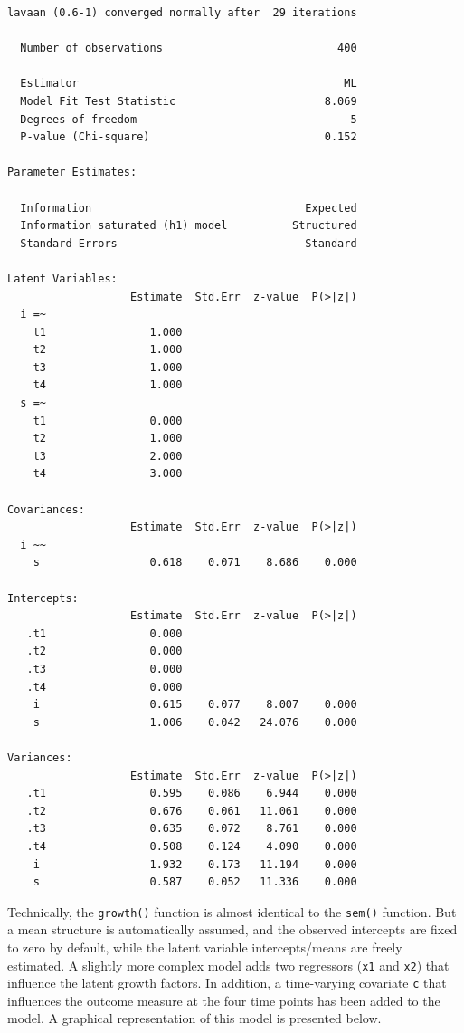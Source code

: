\begin{verbatim}
lavaan (0.6-1) converged normally after  29 iterations

  Number of observations                           400

  Estimator                                         ML
  Model Fit Test Statistic                       8.069
  Degrees of freedom                                 5
  P-value (Chi-square)                           0.152

Parameter Estimates:

  Information                                 Expected
  Information saturated (h1) model          Structured
  Standard Errors                             Standard

Latent Variables:
                   Estimate  Std.Err  z-value  P(>|z|)
  i =~                                                
    t1                1.000                           
    t2                1.000                           
    t3                1.000                           
    t4                1.000                           
  s =~                                                
    t1                0.000                           
    t2                1.000                           
    t3                2.000                           
    t4                3.000                           

Covariances:
                   Estimate  Std.Err  z-value  P(>|z|)
  i ~~                                                
    s                 0.618    0.071    8.686    0.000

Intercepts:
                   Estimate  Std.Err  z-value  P(>|z|)
   .t1                0.000                           
   .t2                0.000                           
   .t3                0.000                           
   .t4                0.000                           
    i                 0.615    0.077    8.007    0.000
    s                 1.006    0.042   24.076    0.000

Variances:
                   Estimate  Std.Err  z-value  P(>|z|)
   .t1                0.595    0.086    6.944    0.000
   .t2                0.676    0.061   11.061    0.000
   .t3                0.635    0.072    8.761    0.000
   .t4                0.508    0.124    4.090    0.000
    i                 1.932    0.173   11.194    0.000
    s                 0.587    0.052   11.336    0.000
\end{verbatim}

Technically, the \texttt{growth()} function is almost identical to the
\texttt{sem()} function. But a mean structure is automatically assumed,
and the observed intercepts are fixed to zero by default, while the
latent variable intercepts/means are freely estimated. A slightly more
complex model adds two regressors (\texttt{x1} and \texttt{x2}) that
influence the latent growth factors. In addition, a time-varying
covariate \texttt{c} that influences the outcome measure at the four
time points has been added to the model. A graphical representation of
this model is presented below.

